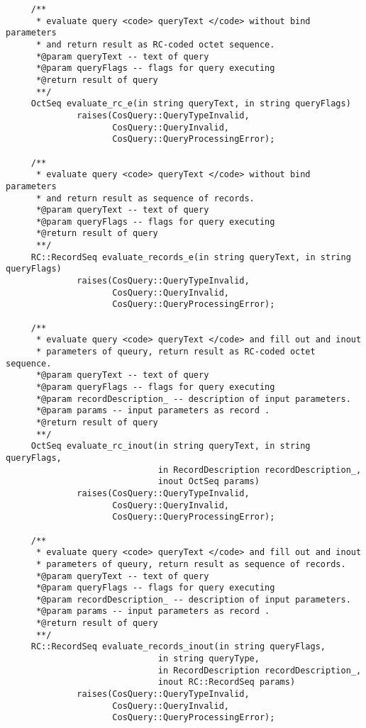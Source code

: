 \documentclass[10pt]{article}
\begin{document}
\begin{verbatim}
     /**
      * evaluate query <code> queryText </code> without bind parameters
      * and return result as RC-coded octet sequence.
      *@param queryText -- text of query
      *@param queryFlags -- flags for query executing
      *@return result of query
      **/
     OctSeq evaluate_rc_e(in string queryText, in string queryFlags)
              raises(CosQuery::QueryTypeInvalid,
                     CosQuery::QueryInvalid,
                     CosQuery::QueryProcessingError);

     /**
      * evaluate query <code> queryText </code> without bind parameters
      * and return result as sequence of records.
      *@param queryText -- text of query
      *@param queryFlags -- flags for query executing
      *@return result of query
      **/
     RC::RecordSeq evaluate_records_e(in string queryText, in string queryFlags)
              raises(CosQuery::QueryTypeInvalid,
                     CosQuery::QueryInvalid,
                     CosQuery::QueryProcessingError);
     
     /**
      * evaluate query <code> queryText </code> and fill out and inout 
      * parameters of queury, return result as RC-coded octet sequence.
      *@param queryText -- text of query
      *@param queryFlags -- flags for query executing
      *@param recordDescription_ -- description of input parameters.
      *@param params -- input parameters as record .
      *@return result of query
      **/
     OctSeq evaluate_rc_inout(in string queryText, in string queryFlags,
                              in RecordDescription recordDescription_,
                              inout OctSeq params)
              raises(CosQuery::QueryTypeInvalid,
                     CosQuery::QueryInvalid,
                     CosQuery::QueryProcessingError);

     /**
      * evaluate query <code> queryText </code> and fill out and inout 
      * parameters of queury, return result as sequence of records.
      *@param queryText -- text of query
      *@param queryFlags -- flags for query executing
      *@param recordDescription_ -- description of input parameters.
      *@param params -- input parameters as record .
      *@return result of query
      **/
     RC::RecordSeq evaluate_records_inout(in string queryFlags, 
                              in string queryType,
                              in RecordDescription recordDescription_,
                              inout RC::RecordSeq params)
              raises(CosQuery::QueryTypeInvalid,
                     CosQuery::QueryInvalid,
                     CosQuery::QueryProcessingError);



\end{verbatim}
\end{document}
